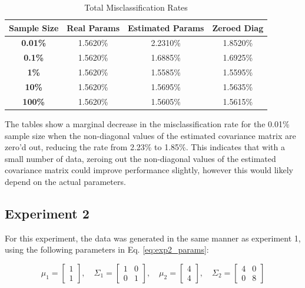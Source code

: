 \documentclass{article}
\begin{document}
\begin{table}[H]
\centering
\small
\caption{Total Misclassification Rates}
\vspace{-0.4em}
\begin{tabular}{cccc}
\toprule
\textbf{Sample Size} & \textbf{Real Params} & \textbf{Estimated Params} & \textbf{Zeroed Diag} \\
\midrule
\textbf{0.01\%} & 1.5620\% & 2.2310\% & 1.8520\% \\
\textbf{0.1\%} & 1.5620\% & 1.6885\% & 1.6925\% \\
\textbf{1\%} & 1.5620\% & 1.5585\% & 1.5595\% \\
\textbf{10\%} & 1.5620\% & 1.5695\% & 1.5635\% \\
\textbf{100\%} & 1.5620\% & 1.5605\% & 1.5615\% \\
\bottomrule
\end{tabular}
\end{table}

The tables show a marginal decrease in the misclassification rate for the 0.01\% sample size when the non-diagonal values of the estimated covariance matrix are zero'd out, 
reducing the rate from 2.23\% to 1.85\%. This indicates that with a small number of data, zeroing out the non-diagonal values of the estimated covariance matrix could 
improve performance slightly, however this would likely depend on the actual parameters. 

\subsection{Experiment 2}\label{experiment-2-1}
\noindent For this experiment, the data was generated in the same manner as experiment 1, using the following parameters in Eq. \ref{eq:exp2_params}: 

\begin{equation}
\mu_{1} = \begin{bmatrix} 1 \\ 1 \end{bmatrix}, 
\quad \Sigma_{1} = \begin{bmatrix} 1 & 0 \\ 0 & 1 \end{bmatrix}, 
\quad \mu_{2} = \begin{bmatrix} 4 \\ 4 \end{bmatrix}, 
\quad \Sigma_{2} = \begin{bmatrix} 4 & 0 \\ 0 & 8 \end{bmatrix}
\label{eq:exp2_params}
\end{equation}
\end{document}

